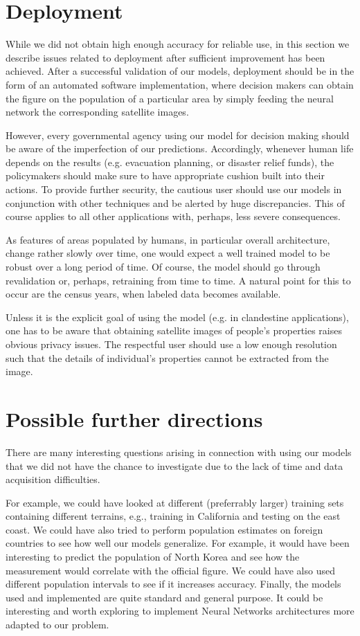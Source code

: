 \documentclass{article}
\begin{document}
\section{Deployment}
While we did not obtain high enough accuracy for reliable use, in this section we describe issues related to deployment after sufficient improvement has been achieved. After a successful validation of our models, deployment should be in the form of an automated software implementation, where decision makers can obtain the figure on the population of a particular area by simply feeding the neural network the corresponding satellite images.

However, every governmental agency using our model for decision making should be aware of the imperfection of our predictions. Accordingly, whenever human life depends on the results (e.g. evacuation planning, or disaster relief funds), the policymakers should make sure to have appropriate cushion built into their actions. To provide further security, the cautious user should use our models in conjunction with other techniques and be alerted by huge discrepancies. This of course applies to all other applications with, perhaps, less severe consequences.

As features of areas populated by humans, in particular overall architecture, change rather slowly over time, one would expect a well trained model to be robust over a long period of time. Of course, the model should go through revalidation or, perhaps, retraining from time to time. A natural point for this to occur are the census years, when labeled data becomes available.

Unless it is the explicit goal of using the model (e.g. in clandestine applications), one has to be aware that obtaining satellite images of people's properties raises obvious privacy issues. The respectful user should use a low enough resolution such that the details of individual's properties cannot be extracted from the image.

\section{Possible further directions}

There are many interesting questions arising in connection with using our models that we did not have the chance to investigate due to the lack of time and data acquisition difficulties.

For example, we could have looked at different (preferrably larger) training sets containing different terrains, e.g., training in California and testing on the east coast. We could have also tried to perform population estimates on foreign countries to see how well our models generalize. For example, it would have been interesting to predict the population of North Korea and see how the measurement would correlate with the official figure. We could have also used different population intervals to see if it increases accuracy. Finally, the models used and implemented are quite standard and general purpose. It could be interesting and worth exploring to implement Neural Networks architectures more adapted to our problem.
\end{document}

